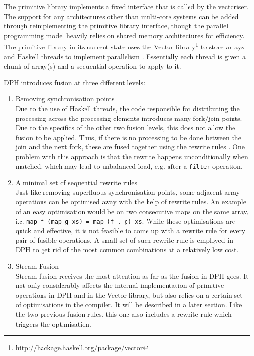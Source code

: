 \documentclass[preamble.tex]{subfiles}
\begin{document}
The primitive library implements a fixed interface that is called by the vectoriser. The support for any architectures other than multi-core systems can be added through reimplementing the primitive library interface, though the parallel programming model heavily relies on shared memory architectures for efficiency. The primitive library in its current state uses the Vector library\footnote{http://hackage.haskell.org/package/vector } to store arrays and Haskell threads to implement parallelism \cite{Jones08atutorial}. Essentially each thread is given a chunk of array(s) and a sequential operation to apply to it.

\label{Lit:DPH-fusion-levels}DPH introduces fusion at three different
levels:
\begin{enumerate}
\item Removing synchronisation points\\ Due to the use of Haskell threads, the code responsible for distributing the processing across the processing elements introduces many fork/join points. Due to the specifics of the other two fusion levels, this does not allow the fusion to be applied. Thus, if there is no processing to be done between the join and the next fork, these are fused together using the rewrite rules \cite{PTH01}. One problem with this approach is that the rewrite happens unconditionally when matched, which may lead to unbalanced load, e.g. after a \texttt{filter} operation.
\item A minimal set of sequential rewrite rules\\ Just like removing superfluous synchronisation points, some adjacent array operations can be optimised away with the help of rewrite rules. An example of an easy optimisation would be on two consecutive maps on the same array, i.e. \texttt{map f (map g xs) = map (f . g) xs}. While these optimisations are quick and effective, it is not feasible to come up with a rewrite rule for every pair of fusible operations. A small set of such rewrite rule is employed in DPH to get rid of the most common combinations at a relatively low cost.
\item Stream Fusion\\ Stream fusion receives the most attention as far as the fusion in DPH goes. It not only considerably affects the internal implementation of primitive operations in DPH and in the Vector library, but also relies on a certain set of optimisations in the compiler. It will be described in a later section. Like the two previous fusion rules, this one also includes a rewrite rule which triggers the optimisation.
\end{enumerate}
\end{document}
